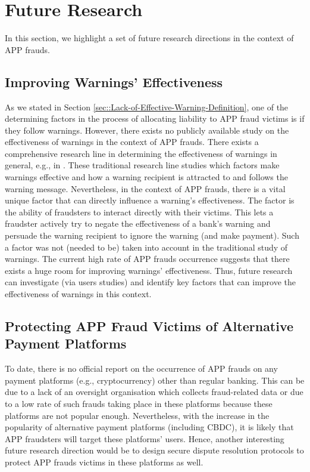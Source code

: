 

\section{Future Research}\label{sec::Future-Research}


In this section, we highlight a set of future research directions in the context of APP frauds. 

\subsection{Improving Warnings' Effectiveness}

As we stated in  Section \ref{sec::Lack-of-Effective-Warning-Definition},  one of the determining factors in the process of allocating liability to APP fraud victims is if they follow warnings. However,  there exists no publicly available study on the effectiveness of warnings in  the context of APP frauds. There exists a comprehensive research line in determining the effectiveness of warnings in general, e.g., in \cite{brinton2016users,felt2014experimenting,laughery2006designing}. These traditional research line studies which factors make warnings effective and how a warning recipient is attracted to and follows the warning message. Nevertheless, in the context of APP frauds, there is a vital unique factor that can directly influence a warning's effectiveness. The factor is the ability of  fraudsters to interact directly with their victims. This lets a fraudster  actively try to negate the effectiveness of a bank's warning and persuade the warning recipient to ignore the warning (and make payment). Such a factor was not (needed to be) taken into account in the traditional study of warnings. The current high rate of  APP frauds occurrence suggests that there exists a huge room for improving warnings' effectiveness. Thus, future research can investigate (via  users studies) and identify  key factors that can improve the effectiveness of warnings in this context. 


\subsection{Protecting APP Fraud Victims of Alternative Payment Platforms}

To date, there is no official report on the occurrence of APP frauds on any  payment platforms (e.g., cryptocurrency) other than  regular banking. This can be due to a lack of an oversight organisation which  collects fraud-related data or due to a low rate of such frauds taking place in these platforms because these platforms are not popular enough. Nevertheless,  with the increase in the popularity of  alternative payment platforms (including CBDC), it is likely that APP fraudsters will target these platforms' users. Hence, another interesting future research direction would be to design secure dispute resolution protocols  to protect  APP frauds victims in these platforms as well. 

